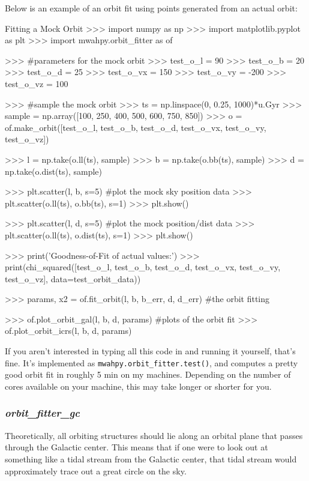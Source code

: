 \documentclass{article}
\begin{document}
Below is an example of an orbit fit using points generated from an actual orbit: 

\begin{codelisting}{Fitting a Mock Orbit}
>>> import numpy as np 
>>> import matplotlib.pyplot as plt
>>> import mwahpy.orbit_fitter as of

>>> #parameters for the mock orbit
>>> test_o_l = 90
>>> test_o_b = 20
>>> test_o_d = 25
>>> test_o_vx = 150
>>> test_o_vy = -200
>>> test_o_vz = 100

>>> #sample the mock orbit
>>> ts = np.linspace(0, 0.25, 1000)*u.Gyr
>>> sample = np.array([100, 250, 400, 500, 600, 750, 850])
>>> o = of.make_orbit([test_o_l, test_o_b, test_o_d, test_o_vx, test_o_vy,
 test_o_vz])
 
>>> l = np.take(o.ll(ts), sample)
>>> b = np.take(o.bb(ts), sample)
>>> d = np.take(o.dist(ts), sample)
   
>>> plt.scatter(l, b, s=5) #plot the mock sky position data
>>> plt.scatter(o.ll(ts), o.bb(ts), s=1)
>>> plt.show()

>>> plt.scatter(l, d, s=5) #plot the mock position/dist data
>>> plt.scatter(o.ll(ts), o.dist(ts), s=1)
>>> plt.show()
    
>>> print('Goodness-of-Fit of actual values:')
>>> print(chi_squared([test_o_l, test_o_b, test_o_d, test_o_vx, test_o_vy,
 test_o_vz], data=test_orbit_data))

>>> params, x2 = of.fit_orbit(l, b, b_err, d, d_err) #the orbit fitting

>>> of.plot_orbit_gal(l, b, d, params) #plots of the orbit fit
>>> of.plot_orbit_icrs(l, b, d, params)
        
\end{codelisting}

If you aren't interested in typing all this code in and running it yourself, that's fine. It's implemented as \verb!mwahpy.orbit_fitter.test()!, and computes a pretty good orbit fit in roughly 5 min on my machines. Depending on the number of cores available on your machine, this may take longer or shorter for you. 

\subsubsection{\textit{orbit\_fitter\_gc}}

Theoretically, all orbiting structures should lie along an orbital plane that passes through the Galactic center. This means that if one were to look out at something like a tidal stream from the Galactic center, that tidal stream would approximately trace out a great circle on the sky. 
\end{document}
